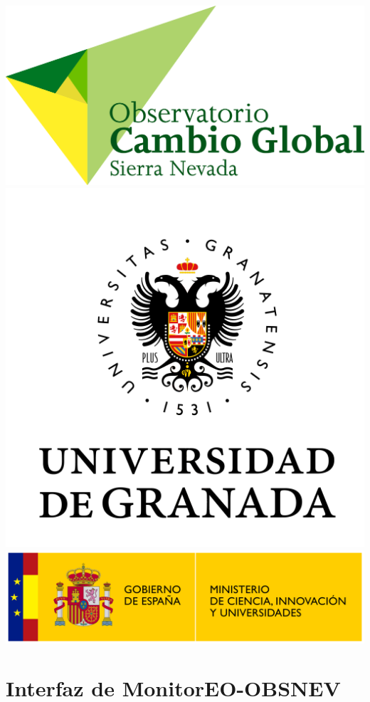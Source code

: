 \documentclass[
]{book}
\begin{document}
\includegraphics{assets/logo-obs.png}
\includegraphics{assets/logo-ugr.png}
\includegraphics{assets/logo-ministerio.png}

\chapter{Interfaz de MonitorEO-OBSNEV}\label{interfaz}
\end{document}
